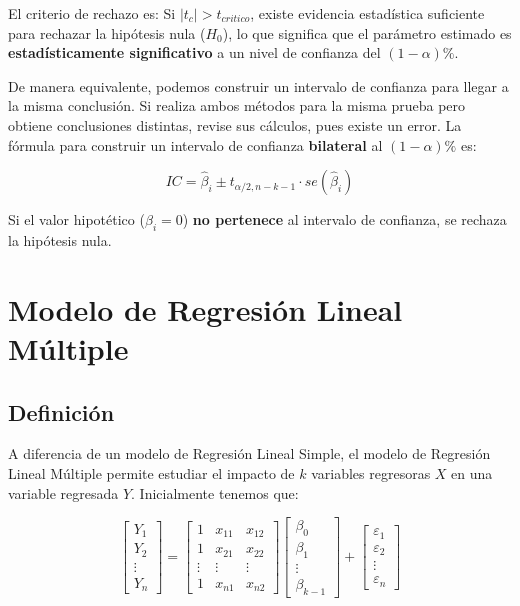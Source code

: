 \documentclass[
]{book}
\begin{document}
El criterio de rechazo es: Si \(|t_c| > t_{critico}\), existe evidencia estadística suficiente para rechazar la hipótesis nula (\(H_0\)), lo que significa que el parámetro estimado es \textbf{estadísticamente significativo} a un nivel de confianza del \((1-\alpha)\%\).

De manera equivalente, podemos construir un intervalo de confianza para llegar a la misma conclusión. Si realiza ambos métodos para la misma prueba pero obtiene conclusiones distintas, revise sus cálculos, pues existe un error. La fórmula para construir un intervalo de confianza \textbf{bilateral} al \((1-\alpha)\%\) es:

\[IC = \hat{\beta}_i \pm t_{\alpha/2, n-k-1} \cdot se(\hat{\beta}_i)\]

Si el valor hipotético (\(\beta_i = 0\)) \textbf{no pertenece} al intervalo de confianza, se rechaza la hipótesis nula.

\chapter{Modelo de Regresión Lineal Múltiple}\label{modelo-de-regresiuxf3n-lineal-muxfaltiple}

\section{Definición}\label{definiciuxf3n-1}

A diferencia de un modelo de Regresión Lineal Simple, el modelo de Regresión Lineal Múltiple permite estudiar el impacto de \(k\) variables regresoras \(X\) en una variable regresada \(Y\). Inicialmente tenemos que:

\[
\begin{bmatrix}
    Y_1 \\
    Y_2 \\
    \vdots \\
    Y_n
\end{bmatrix}
=
\begin{bmatrix}
    1 & x_{11} & x_{12} \\
    1 & x_{21} & x_{22} \\
    \vdots & \vdots & \vdots \\
    1 & x_{n1} & x_{n2}
\end{bmatrix}
\begin{bmatrix}
    \beta_0 \\
    \beta_1 \\
    \vdots \\
    \beta_{k-1}
\end{bmatrix}
+
\begin{bmatrix}
    \varepsilon_1 \\
    \varepsilon_2 \\
    \vdots \\
    \varepsilon_n
\end{bmatrix}
\]
\end{document}
